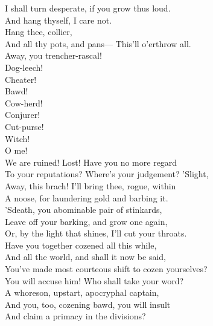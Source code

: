 \documentclass[a4paper,oneside,12pt]{memoir}
\begin{document}
\begin{drama*}
\facespeaks I shall turn desperate, if you grow thus loud.\\
\subtlespeaks And hang thyself, I care not.\\
\facespeaks {} Hang thee, collier,\\
And all thy pots, and pans---
\dolspeaks {} This'll o'erthrow all.\\
\subtlespeaks Away, you trencher-rascal!\\
\facespeaks {} Dog-leech!\\
\subtlespeaks  {} Cheater!\\
\facespeaks Bawd!\\
\subtlespeaks {} Cow-herd!\\
\facespeaks {} Conjurer!\\
\subtlespeaks {} Cut-purse!\\
\facespeaks {} Witch!\\
\dolspeaks {} O me!\\
We are ruined! Lost! Have you no more regard\\
To your reputations? Where's your judgement? 'Slight,\\
\facespeaks Away, this brach! I'll bring thee, rogue, within\\
A noose, for laundering gold and barbing it.\\
\dolspeaks 'Sdeath, you abominable pair of stinkards,\\
Leave off your barking, and grow one again,\\
Or, by the light that shines, I'll cut your throats.\\
Have you together cozened all this while,\\
And all the world, and shall it now be said,\\
You've made most courteous shift to cozen yourselves?\\
You will accuse him! Who shall take your word?\\
A whoreson, upstart, apocryphal captain,\\
And you, too, cozening bawd, you will insult\\
And claim a primacy in the divisions?\\

\end{drama*}
\end{document}
